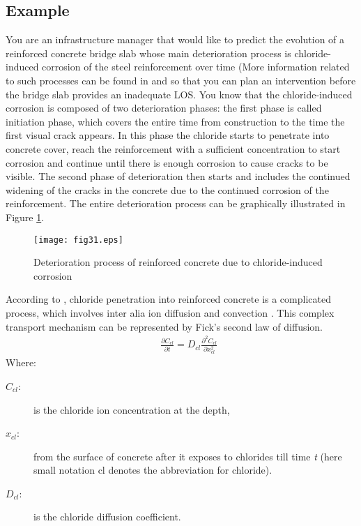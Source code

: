 \subsection{Example}
You are an infrastructure manager that would like to predict the evolution of a reinforced concrete bridge slab whose main deterioration process is chloride-induced corrosion of the steel reinforcement over time (More information related to such processes can be found in \cite{Elsener2013} and \cite{Bertolini2013} so that you can plan an intervention before the bridge slab provides an inadequate LOS. You know that the chloride-induced corrosion is composed of two deterioration phases: the first phase is called initiation phase, which covers the entire time from construction to the time the first visual crack appears. In this phase the chloride starts to penetrate into concrete cover, reach the reinforcement with a sufficient concentration to start corrosion and continue until there is enough corrosion to cause cracks to be visible. The second phase of deterioration then starts and includes the continued widening of the cracks in the concrete due to the continued corrosion of the reinforcement. The entire deterioration process can be graphically illustrated in Figure \ref{fig:31}.
\begin{figure}[h]
\texttt{[image: fig31.eps]}
\caption{Deterioration process of reinforced concrete due to chloride-induced corrosion}\label{fig:31}
\end{figure}
According to \cite{DuraCrete2000}, chloride penetration into reinforced concrete is a complicated process, which involves inter alia ion diffusion and convection \citep{Bertolini2013}. This complex transport mechanism can be represented by Fick's second law of diffusion.
\begin{eqnarray}
      && \frac{{\partial {C_{cl}}}}{{\partial t}} = {D_{cl}}\frac{{{\partial ^2}{C_{cl}}}}{{\partial x_{cl}^2}} \label{eq31}
\end{eqnarray}
Where:
\begin{adjustwidth}{1cm}{}
\begin{description}
\item[$C_{cl}$:] is the chloride ion concentration at the depth,
\item[$x_{cl}$:] from the surface of concrete after it exposes to chlorides till time \textit{t} (here small notation cl denotes the abbreviation for chloride).  
\item[$D_{cl}$:] is the chloride diffusion coefficient. 
\end{description}
\end{adjustwidth}
